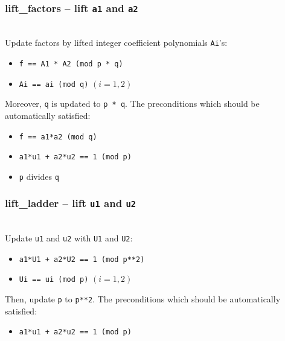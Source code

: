   \subsubsection{lift\_factors -- lift {\tt a1} and {\tt a2}}
   \\
   \spacing
   \quad Update factors by lifted integer coefficient polynomials {\tt Ai}'s:
   \begin{itemize}
   \item {\tt f == A1 * A2 (mod p * q)}
   \item {\tt Ai == ai (mod q)} \((i = 1, 2)\)
   \end{itemize}
   Moreover, {\tt q} is updated to {\tt p * q}.
   \spacing
   \quad \negok The preconditions which should be automatically satisfied:
   \begin{itemize}
   \item {\tt f == a1*a2 (mod q)}
   \item {\tt a1*u1 + a2*u2 == 1 (mod p)}
   \item {\tt p} divides {\tt q}
   \end{itemize}
   \subsubsection{lift\_ladder -- lift {\tt u1} and {\tt u2}}
   \\
   \spacing
   \quad Update {\tt u1} and {\tt u2} with {\tt U1} and {\tt U2}:
   \begin{itemize}
   \item {\tt a1*U1 + a2*U2 == 1 (mod p**2)}
   \item {\tt Ui == ui (mod p)} \((i = 1, 2)\)
   \end{itemize}
   Then, update {\tt p} to {\tt p**2}.
   \spacing
   \quad \negok The preconditions which should be automatically satisfied:
   \begin{itemize}
   \item {\tt a1*u1 + a2*u2 == 1 (mod p)}
   \end{itemize}

